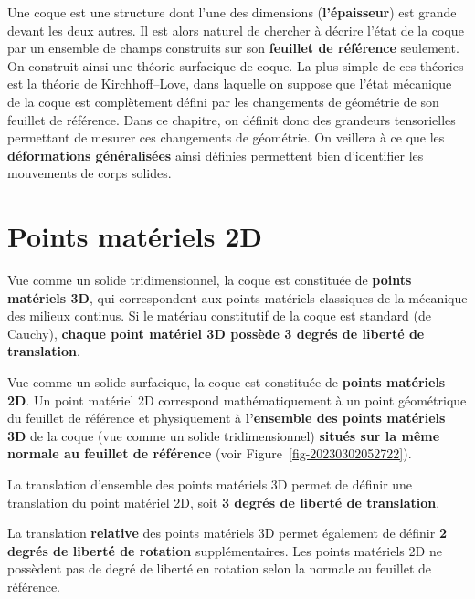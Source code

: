 \documentclass[
  a4paper,
  DIV=11,
  numbers=noendperiod]{scrreprt}
\begin{document}
Une coque est une structure dont l'une des dimensions
(\textbf{l'épaisseur}) est grande devant les deux autres. Il est alors
naturel de chercher à décrire l'état de la coque par un ensemble de
champs construits sur son \textbf{feuillet de référence} seulement. On
construit ainsi une théorie surfacique de coque. La plus simple de ces
théories est la théorie de Kirchhoff--Love, dans laquelle on suppose que
l'état mécanique de la coque est complètement défini par les changements
de géométrie de son feuillet de référence. Dans ce chapitre, on définit
donc des grandeurs tensorielles permettant de mesurer ces changements de
géométrie. On veillera à ce que les \textbf{déformations généralisées}
ainsi définies permettent bien d'identifier les mouvements de corps
solides.

\hypertarget{points-matuxe9riels-2d}{%
\section{Points matériels 2D}\label{points-matuxe9riels-2d}}

Vue comme un solide tridimensionnel, la coque est constituée de
\textbf{points matériels 3D}, qui correspondent aux points matériels
classiques de la mécanique des milieux continus. Si le matériau
constitutif de la coque est standard (de Cauchy), \textbf{chaque point
matériel 3D possède 3 degrés de liberté de translation}.

Vue comme un solide surfacique, la coque est constituée de
\textbf{points matériels 2D}. Un point matériel 2D correspond
mathématiquement à un point géométrique du feuillet de référence et
physiquement à \textbf{l'ensemble des points matériels 3D} de la coque
(vue comme un solide tridimensionnel) \textbf{situés sur la même normale
au feuillet de référence} (voir Figure~\ref{fig-20230302052722}).

La translation d'ensemble des points matériels 3D permet de définir une
translation du point matériel 2D, soit \textbf{3 degrés de liberté de
translation}.

La translation \textbf{relative} des points matériels 3D permet
également de définir \textbf{2 degrés de liberté de rotation}
supplémentaires. Les points matériels 2D ne possèdent pas de degré de
liberté en rotation selon la normale au feuillet de référence.
\end{document}
